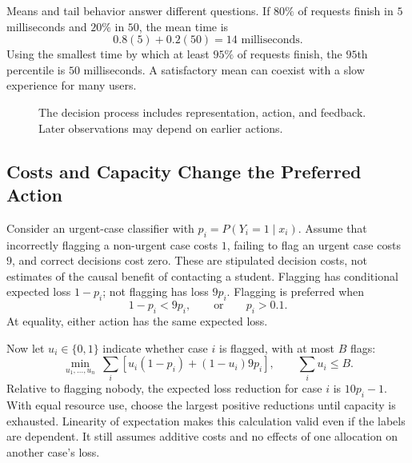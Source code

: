 Means and tail behavior answer different questions. If $80\%$ of requests finish in $5$ milliseconds and $20\%$ in $50$, the mean time is
\[
0.8(5)+0.2(50)=14\text{ milliseconds}.
\]
Using the smallest time by which at least $95\%$ of requests finish, the $95$th percentile is $50$ milliseconds. A satisfactory mean can coexist with a slow experience for many users.

\begin{figure}[t]
\centering
{}
\caption{The decision process includes representation, action, and feedback. Later observations may depend on earlier actions.}
\label{fig:system-pipeline}
\end{figure}

\subsection{Costs and Capacity Change the Preferred Action}

Consider an urgent-case classifier with $p_i=P(Y_i=1\mid x_i)$. Assume that incorrectly flagging a non-urgent case costs $1$, failing to flag an urgent case costs $9$, and correct decisions cost zero. These are stipulated decision costs, not estimates of the causal benefit of contacting a student. Flagging has conditional expected loss $1-p_i$; not flagging has loss $9p_i$. Flagging is preferred when
\[
1-p_i<9p_i,\qquad\text{or}\qquad p_i>0.1.
\]
At equality, either action has the same expected loss.

Now let $u_i\in\{0,1\}$ indicate whether case $i$ is flagged, with at most $B$ flags:
\[
\min_{u_1,\ldots,u_n}\ \sum_i\left[u_i(1-p_i)+(1-u_i)9p_i\right],
\qquad \sum_i u_i\le B.
\]
Relative to flagging nobody, the expected loss reduction for case $i$ is $10p_i-1$. With equal resource use, choose the largest positive reductions until capacity is exhausted. Linearity of expectation makes this calculation valid even if the labels are dependent. It still assumes additive costs and no effects of one allocation on another case's loss.

